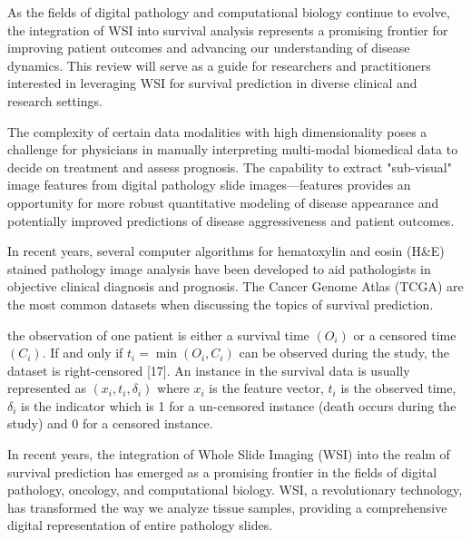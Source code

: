 \documentclass[journal,twoside,web]{ieeecolor}
\begin{document}
As the fields of digital pathology and computational biology continue to evolve, the integration of WSI into survival analysis represents a promising frontier for improving patient outcomes and advancing our understanding of disease dynamics. This review will serve as a guide for researchers and practitioners interested in leveraging WSI for survival prediction in diverse clinical and research settings.


The complexity of certain data modalities with high dimensionality poses a challenge for physicians in manually interpreting multi-modal biomedical data to decide on treatment and assess prognosis\cite{gevaert2006predicting}. 
The capability to extract "sub-visual" image features from digital pathology slide images—features provides an opportunity for more robust quantitative modeling of disease appearance and potentially improved predictions of disease aggressiveness and patient outcomes\cite{madabhushi2016image}. 

In recent years, several computer algorithms for hematoxylin and eosin (H\&E) stained pathology image analysis have been developed to aid pathologists in objective clinical diagnosis and prognosis.
The Cancer Genome Atlas (TCGA) are the most common datasets when discussing the topics of survival prediction.

the observation of one patient is either a survival time $(O_i)$ or a censored time $(C_i).$ If and only if $t_i=\min(O_i,C_i)$ can be observed during the study, the dataset is right-censored [17]. An instance in the survival data is usually represented as $(x_i,t_i,\delta_i)$ where $x_i$ is the feature vector, $t_i$ is the observed time, $\delta_i$ is the indicator which is 1 for a un-censored instance (death occurs during the study) and 0 for a censored instance.

In recent years, the integration of Whole Slide Imaging (WSI) into the realm of survival prediction has emerged as a promising frontier in the fields of digital pathology, oncology, and computational biology. WSI, a revolutionary technology, has transformed the way we analyze tissue samples, providing a comprehensive digital representation of entire pathology slides.
\end{document}

